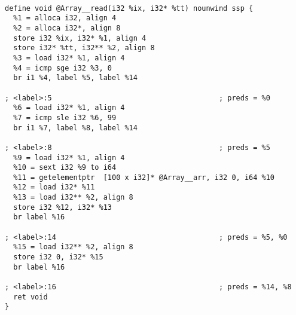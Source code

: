 \documentclass[10pt,a4paper]{article}
\begin{document}
\begin{verbatim}

define void @Array__read(i32 %ix, i32* %tt) nounwind ssp {
  %1 = alloca i32, align 4
  %2 = alloca i32*, align 8
  store i32 %ix, i32* %1, align 4
  store i32* %tt, i32** %2, align 8
  %3 = load i32* %1, align 4
  %4 = icmp sge i32 %3, 0
  br i1 %4, label %5, label %14

; <label>:5                                       ; preds = %0
  %6 = load i32* %1, align 4
  %7 = icmp sle i32 %6, 99
  br i1 %7, label %8, label %14

; <label>:8                                       ; preds = %5
  %9 = load i32* %1, align 4
  %10 = sext i32 %9 to i64
  %11 = getelementptr  [100 x i32]* @Array__arr, i32 0, i64 %10
  %12 = load i32* %11
  %13 = load i32** %2, align 8
  store i32 %12, i32* %13
  br label %16

; <label>:14                                      ; preds = %5, %0
  %15 = load i32** %2, align 8
  store i32 0, i32* %15
  br label %16

; <label>:16                                      ; preds = %14, %8
  ret void
}
\end{verbatim}
\end{document}
